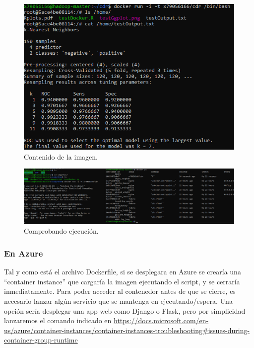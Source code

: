 \begin{figure}[H]\center\includegraphics[width=.95\linewidth]{img/r/r2.png}\caption{Contenido de la imagen.}\end{figure}

\begin{figure}[H]\center\includegraphics[width=.95\linewidth]{img/r/r4.png}\caption{Comprobando ejecución.}\end{figure}

\subsubsection{En Azure}

Tal y como está el archivo Dockerfile, si se desplegara en Azure se crearía una ``container instance'' que cargaría la imagen ejecutando el script, y se cerraría inmediatamente. Para poder acceder al contenedor antes de que se cierre, es necesario lanzar algún servicio que se mantenga en ejecutando/espera. Una opción sería desplegar una app web como Django o Flask, pero por simplicidad lanzaremos el comando indicado en \url{https://docs.microsoft.com/en-us/azure/container-instances/container-instances-troubleshooting#issues-during-container-group-runtime}

